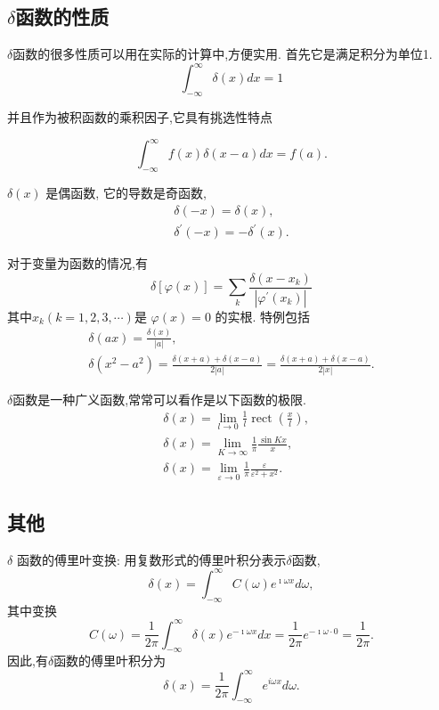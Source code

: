 \subsection{$\delta$函数的性质}
$\delta$函数的很多性质可以用在实际的计算中,方便实用. 首先它是满足积分为单位1.
$$
\int_{-\infty}^{\infty} \delta(x) d x=1
$$

并且作为被积函数的乘积因子,它具有挑选性特点

$$
\int_{-\infty}^{\infty} f(x) \delta(x-a) d x=f(a).
$$

$\delta(x)$ 是偶函数, 它的导数是奇函数,
$$
\begin{gathered}
\delta(-x)=\delta(x), \\
\delta^{\prime}(-x)=-\delta^{\prime}(x) .
\end{gathered}
$$

对于变量为函数的情况,有
\begin{equation}
    \delta[\varphi(x)]=\sum_k \frac{\delta\left(x-x_k\right)}{\left|\varphi^{\prime}\left(x_k\right)\right|}
\end{equation}
其中$x_k(k=1,2,3, \cdots)$是
$\varphi(x)=0$ 的实根.
特例包括
\begin{equation}
    \begin{gathered}
    \delta(a x)=\frac{\delta(x)}{|a|}, \\
    \delta\left(x^2-a^2\right)=\frac{\delta(x+a)+\delta(x-a)}{2|a|}=\frac{\delta(x+a)+\delta(x-a)}{2|x|} .
    \end{gathered}
\end{equation}

$\delta$函数是一种广义函数,常常可以看作是以下函数的极限.
\begin{equation}
    \begin{aligned}
    & \delta(x)=\lim _{l \rightarrow 0} \frac{1}{l} \operatorname{rect}\left(\frac{x}{l}\right), \\
    & \delta(x)=\lim _{K \rightarrow \infty} \frac{1}{\pi} \frac{\sin K x}{x}, \\
    & \delta(x)=\lim _{\varepsilon \rightarrow 0} \frac{1}{\pi} \frac{\varepsilon}{\varepsilon^2+x^2} .
    \end{aligned}
\end{equation}

\subsection{其他}
$\delta$ 函数的傅里叶变换: 用复数形式的傅里叶积分表示$\delta$函数,
\begin{equation}
\delta(x)=\int_{-\infty}^{\infty} C(\omega) e^{\imath\omega x} d \omega,
\end{equation}
其中变换
$$
C(\omega)=\frac{1}{2 \pi} \int_{-\infty}^{\infty} \delta(x) e^{-\imath\omega x} d x=\frac{1}{2 \pi} e^{-\imath\omega \cdot 0}=\frac{1}{2 \pi} .
$$
因此,有$\delta$函数的傅里叶积分为
\begin{equation}
\delta(x)=\frac{1}{2 \pi} \int_{-\infty}^{\infty} e^{i \omega x} d \omega .
\end{equation}

